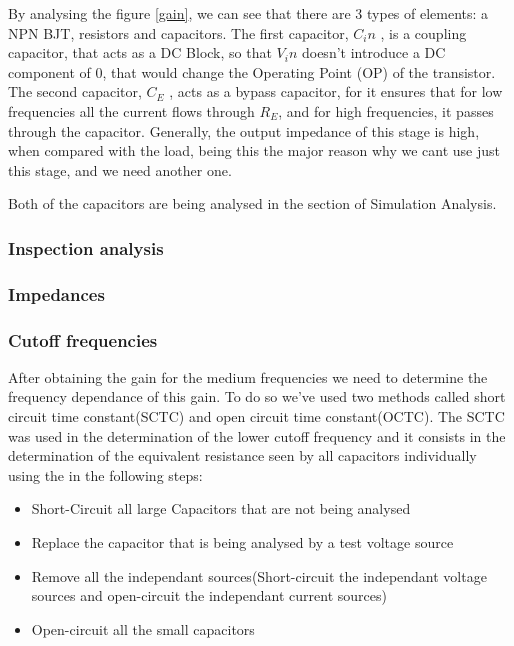 By analysing the figure \ref{gain}, we can see that there are 3 types of elements: a NPN BJT, resistors and capacitors.
The first capacitor, $C_in$ , is a coupling capacitor, that acts as a DC Block, so that $V_in$ doesn’t
introduce a DC component of 0, that would change the Operating Point (OP) of the transistor.
The second capacitor, $C _E$ , acts as a bypass capacitor, for it ensures that for low frequencies
all the current flows through $R_E$, and for high frequencies, it passes through the capacitor.
Generally, the output impedance of this stage is high, when compared with the load,
being this the major reason why we cant use just this stage, and we need another one. \par
Both of the capacitors are being analysed in the section of Simulation Analysis.




\subsubsection{Inspection analysis}




\subsubsection{Impedances}


\subsubsection{Cutoff frequencies}

After obtaining the gain for the medium frequencies we need to determine the frequency dependance of this gain. To do so we've used two methods called short circuit time constant(SCTC) and open circuit time constant(OCTC). The SCTC was used in the determination of the lower cutoff frequency and it consists in the determination of the equivalent resistance seen by all capacitors individually using the in the following steps:

\begin{itemize}

\item Short-Circuit all large Capacitors that are not being analysed 
\item Replace the capacitor that is being analysed by a test voltage source
\item Remove all the independant sources(Short-circuit the independant voltage sources and open-circuit the independant current sources) 
\item Open-circuit all the small capacitors

\end{itemize}

